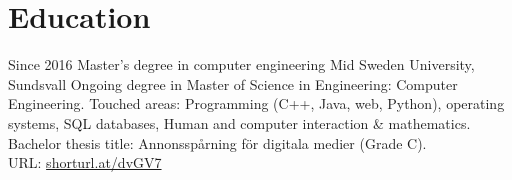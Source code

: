 \section{Education}



\begin{entrylist}
  \entry
    {Since 2016}
    {Master's degree in computer engineering}
    {Mid Sweden University, Sundsvall}
    {%
      Ongoing degree in Master of Science in Engineering: Computer\\Engineering. Touched areas: Programming (C++, Java, web, Python), operating systems, SQL databases, Human and computer interaction \& mathematics. \\
      Bachelor thesis title: Annonsspårning för digitala medier (Grade C). \\URL: \href{shorturl.at/dvGV7}{shorturl.at/dvGV7}
      }
\end{entrylist}